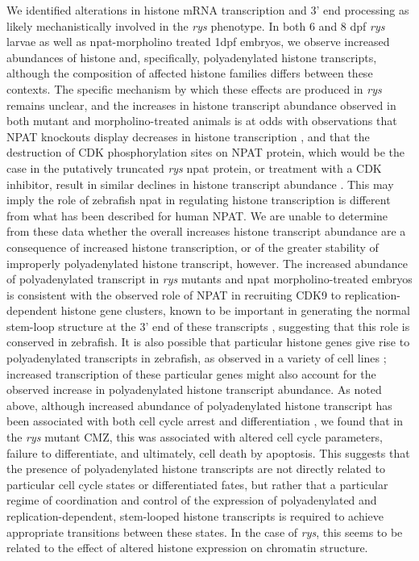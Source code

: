 We identified alterations in histone mRNA transcription and 3’ end processing as likely mechanistically involved in the \textit{rys} phenotype. In both 6 and 8 dpf \textit{rys} larvae as well as npat-morpholino treated 1dpf embryos, we observe increased abundances of histone and, specifically, polyadenylated histone transcripts, although the composition of affected histone families differs between these contexts. The specific mechanism by which these effects are produced in \textit{rys} remains unclear, and the increases in histone transcript abundance observed in both mutant and morpholino-treated animals is at odds with observations that NPAT knockouts display decreases in histone transcription \cite{Ye2003}, and that the destruction of CDK phosphorylation sites on NPAT protein, which would be the case in the putatively truncated \textit{rys} npat protein, or treatment with a CDK inhibitor, result in similar declines in histone transcript abundance \cite{Ma2000,Mitra2009}. This may imply the role of zebrafish npat in regulating histone transcription is different from what has been described for human NPAT. We are unable to determine from these data whether the overall increases histone transcript abundance are a consequence of increased histone transcription, or of the greater stability of improperly polyadenylated histone transcript, however. The increased abundance of polyadenylated transcript in \textit{rys} mutants and npat morpholino-treated embryos is consistent with the observed role of NPAT in recruiting CDK9 to replication-dependent histone gene clusters, known to be important in generating the normal stem-loop structure at the 3’ end of these transcripts \cite{Pirngruber2009}, suggesting that this role is conserved in zebrafish. It is also possible that particular histone genes give rise to polyadenylated transcripts in zebrafish, as observed in a variety of cell lines \cite{Kari2013}; increased transcription of these particular genes might also account for the observed increase in polyadenylated histone transcript abundance. As noted above, although increased abundance of polyadenylated histone transcript has been associated with both cell cycle arrest and differentiation \cite{Kari2013}, we found that in the \textit{rys} mutant CMZ, this was associated with altered cell cycle parameters, failure to differentiate, and ultimately, cell death by apoptosis. This suggests that the presence of polyadenylated histone transcripts are not directly related to particular cell cycle states or differentiated fates, but rather that a particular regime of coordination and control of the expression of polyadenylated and replication-dependent, stem-looped histone transcripts is required to achieve appropriate transitions between these states. In the case of \textit{rys}, this seems to be related to the effect of altered histone expression on chromatin structure.